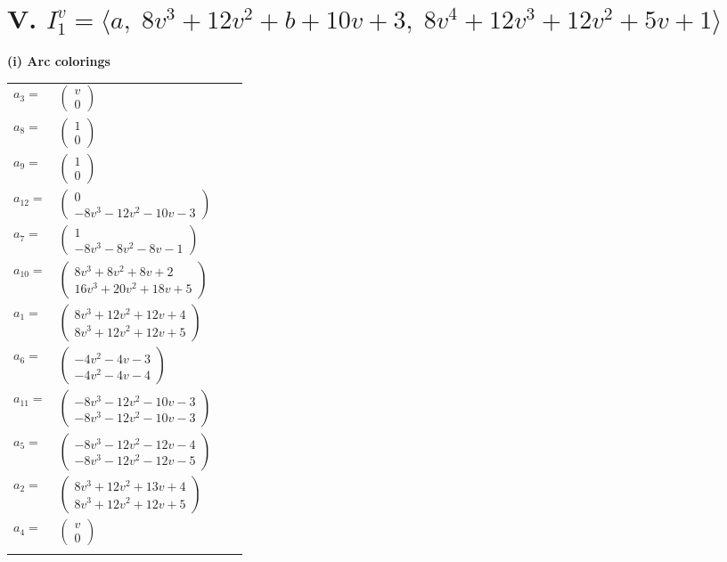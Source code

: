 \documentclass[1p]{elsarticle_modified}
\theoremstyle{definition}
\begin{document}
\centering \section*{V. $I^v_{1}= \langle a,\;8 v^3+12 v^2+b+10 v+3,\;8 v^4+12 v^3+12 v^2+5 v+1 \rangle$}
\flushleft \textbf{(i) Arc colorings}\\
\begin{tabular}{m{7pt} m{180pt} m{7pt} m{180pt} }
\flushright $a_{3}=$&$\begin{pmatrix}v\\0\end{pmatrix}$ \\
\flushright $a_{8}=$&$\begin{pmatrix}1\\0\end{pmatrix}$ \\
\flushright $a_{9}=$&$\begin{pmatrix}1\\0\end{pmatrix}$ \\
\flushright $a_{12}=$&$\begin{pmatrix}0\\-8 v^3-12 v^2-10 v-3\end{pmatrix}$ \\
\flushright $a_{7}=$&$\begin{pmatrix}1\\-8 v^3-8 v^2-8 v-1\end{pmatrix}$ \\
\flushright $a_{10}=$&$\begin{pmatrix}8 v^3+8 v^2+8 v+2\\16 v^3+20 v^2+18 v+5\end{pmatrix}$ \\
\flushright $a_{1}=$&$\begin{pmatrix}8 v^3+12 v^2+12 v+4\\8 v^3+12 v^2+12 v+5\end{pmatrix}$ \\
\flushright $a_{6}=$&$\begin{pmatrix}-4 v^2-4 v-3\\-4 v^2-4 v-4\end{pmatrix}$ \\
\flushright $a_{11}=$&$\begin{pmatrix}-8 v^3-12 v^2-10 v-3\\-8 v^3-12 v^2-10 v-3\end{pmatrix}$ \\
\flushright $a_{5}=$&$\begin{pmatrix}-8 v^3-12 v^2-12 v-4\\-8 v^3-12 v^2-12 v-5\end{pmatrix}$ \\
\flushright $a_{2}=$&$\begin{pmatrix}8 v^3+12 v^2+13 v+4\\8 v^3+12 v^2+12 v+5\end{pmatrix}$ \\
\flushright $a_{4}=$&$\begin{pmatrix}v\\0\end{pmatrix}$\\&\end{tabular}
\end{document}
